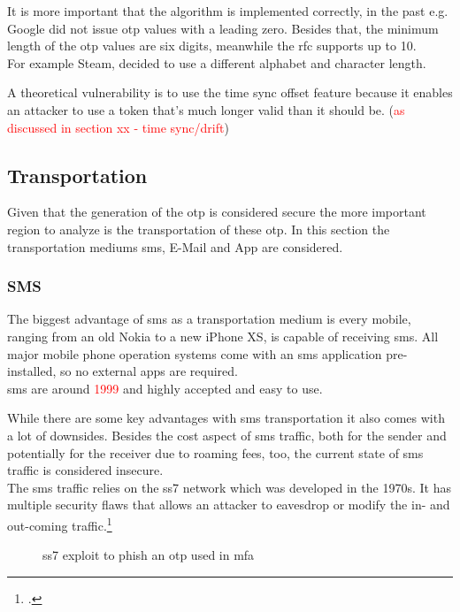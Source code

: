 It is more important that the algorithm is implemented correctly, in the past e.g. Google did not issue \gls{otp} values with a leading zero. Besides that, the minimum length of the \gls{otp} values are six digits, meanwhile the \gls{rfc} supports up to 10.\\
For example Steam, decided to use a different alphabet and character length.

A theoretical vulnerability is to use the time sync offset feature because it enables an attacker to use a token that's much longer valid than it should be. (\textcolor{red}{as discussed in section xx - time sync/drift})

\subsection{Transportation}

Given that the generation of the \gls{otp} is considered secure the more important region to analyze is the transportation of these \gls{otp}. In this section the transportation mediums \gls{sms}, E-Mail and App are considered.

\subsubsection{SMS}

The biggest advantage of \gls{sms} as a transportation medium is every mobile, ranging from an old Nokia to a new iPhone XS, is capable of receiving \gls{sms}. All major mobile phone operation systems come with an \gls{sms} application pre-installed, so no external apps are required.\\
\gls{sms} are around \textcolor{red}{1999} and highly accepted and easy to use.

\newpage

While there are some key advantages with \gls{sms} transportation it also comes with a lot of downsides. Besides the cost aspect of \gls{sms} traffic, both for the sender and potentially for the receiver due to roaming fees, too, the current state of \gls{sms} traffic is considered insecure.\\
The \gls{sms} traffic relies on the \gls{ss7} network which was developed in the 1970s. It has multiple security flaws that allows an attacker to eavesdrop or modify the in- and out-coming traffic.\footcite{WELCH201717,7997246,puzankov2017stealthy}

\begin{figure}[hbt]
	\centering
	
	\caption[\gls{ss7} exploit to phish an \gls{otp} used in \gls{mfa}]{\gls{ss7} exploit to phish an \gls{otp} used in \gls{mfa}\footnotemark}
	\label{fig:2fa_flow_ss7}
\end{figure}

